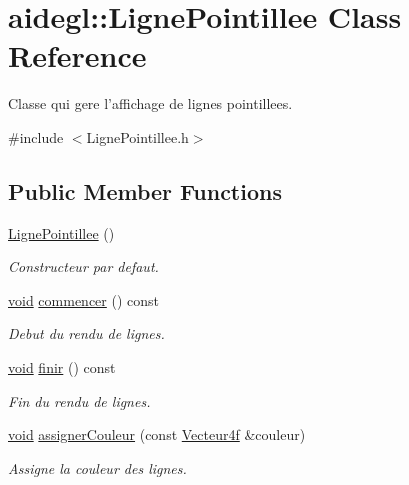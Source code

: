 \hypertarget{classaidegl_1_1_ligne_pointillee}{\section{aidegl\-:\-:Ligne\-Pointillee Class Reference}
\label{classaidegl_1_1_ligne_pointillee}
}


Classe qui gere l'affichage de lignes pointillees.  




{\ttfamily \#include $<$Ligne\-Pointillee.\-h$>$}

\subsection*{Public Member Functions}
\begin{DoxyCompactItemize}
\item 
\hyperlink{classaidegl_1_1_ligne_pointillee_a4fc590690c8bbc7368fb355a71d5eaf2}{Ligne\-Pointillee} ()
\begin{DoxyCompactList}\small\item\em Constructeur par defaut. \end{DoxyCompactList}\item 
\hyperlink{wglew_8h_aeea6e3dfae3acf232096f57d2d57f084}{void} \hyperlink{classaidegl_1_1_ligne_pointillee_a455e3f5a717d72b04808c90c3d20f23f}{commencer} () const 
\begin{DoxyCompactList}\small\item\em Debut du rendu de lignes. \end{DoxyCompactList}\item 
\hyperlink{wglew_8h_aeea6e3dfae3acf232096f57d2d57f084}{void} \hyperlink{classaidegl_1_1_ligne_pointillee_a5a1522b90f6970b3a33103935bed74da}{finir} () const 
\begin{DoxyCompactList}\small\item\em Fin du rendu de lignes. \end{DoxyCompactList}\item 
\hyperlink{wglew_8h_aeea6e3dfae3acf232096f57d2d57f084}{void} \hyperlink{classaidegl_1_1_ligne_pointillee_af051ae200dfd9a5f5a26591a139e7939}{assigner\-Couleur} (const \hyperlink{group__utilitaire_ga6a8205c734fc1c9d1272ea424efb2606}{Vecteur4f} \&couleur)
\begin{DoxyCompactList}\small\item\em Assigne la couleur des lignes. \end{DoxyCompactList}\item 

\end{DoxyCompactItemize}
